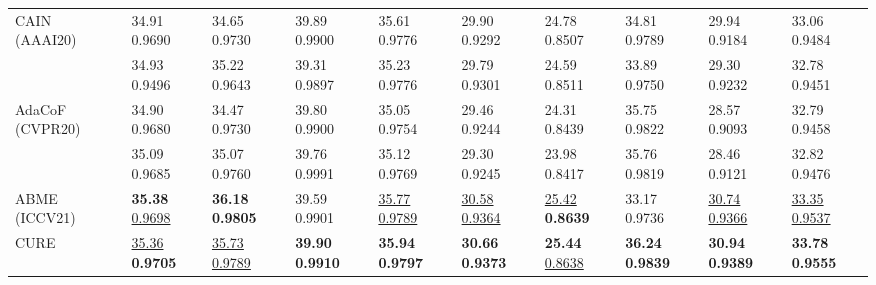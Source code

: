 \documentclass[12pt]{article}
\newcommand{\first}[1]{{\color{red} \textbf{#1}}}
\newcommand{\second}[1]{{\color{lightblue} \underline{#1}}}
\def\proposed{CURE}
\begin{document}
\begin{table*}[t!]
{\begin{tabularx}{\textwidth}{C{.1\textwidth}C{.07\textwidth}C{.07\textwidth}C{.07\textwidth}C{.07\textwidth}C{.07\textwidth}C{.07\textwidth}C{.07\textwidth}C{.07\textwidth} | C{.07\textwidth}}
     {CAIN~\cite{choi2020channel} (AAAI20)}                        &  {34.91   0.9690}                     &  {34.65  0.9730}                     &  {39.89  0.9900}                     &  {35.61  0.9776}                     &  {29.90  0.9292}                     &  {24.78  0.8507}  &  {34.81  0.9789}  &  {29.94  0.9184}  &  {33.06  0.9484}                   \\

                            &  {34.93  0.9496}                     &  {35.22  0.9643}                     &  {39.31  0.9897}                     &  {35.23  0.9776}                     &  {29.79  0.9301}                     &  {24.59  0.8511}  &  {33.89  0.9750} &  {29.30  0.9232} &  {32.78  0.9451}                     \\

     {AdaCoF~\cite{lee2020adacof} (CVPR20)} &  {34.90  0.9680} &  {34.47  0.9730} &  {39.80  0.9900} &  {35.05  0.9754} &  {29.46  0.9244} &  {24.31  0.8439} &  {35.75  0.9822} &  {28.57  0.9093} &  {32.79  0.9458} \\

      &  {35.09  0.9685} &  {35.07  0.9760} &  {39.76  0.9991} &  {35.12  0.9769} &  {29.30  0.9245} &  {23.98  0.8417} &  {35.76  0.9819} &  {28.46  0.9121} &  {32.82  0.9476}\\ 
    
     {ABME~\cite{park2021asymmetric} (ICCV21)}                        &  \first{35.38}   \second{0.9698}                     &  \first{36.18}   \first{0.9805}                    &  {39.59   0.9901}                     &  \second{35.77}   \second{0.9789}                     &  \second{30.58}  \second{0.9364}                     &  \second{25.42}   \first{0.8639} &  {33.17  0.9736} &  \second{30.74}  \second{0.9366} &  \second{33.35} \second{0.9537}                    \\

    \midrule
    {\proposed}           &  \second{35.36} \first{0.9705}   &  \second{35.73}   \second{0.9789}      &  \first{39.90}  \first{0.9910} &  \first{35.94}   \first{0.9797} &  \first{30.66}  \first{0.9373} &  \first{25.44}   \second{0.8638} &  \first{36.24}  \first{0.9839} &  \first{30.94}  \first{0.9389} &  \first{33.78}  \first{0.9555} \\
    \bottomrule

    \end{tabularx}
    \label{tb:main}
  }
\end{table*}
\end{document}
